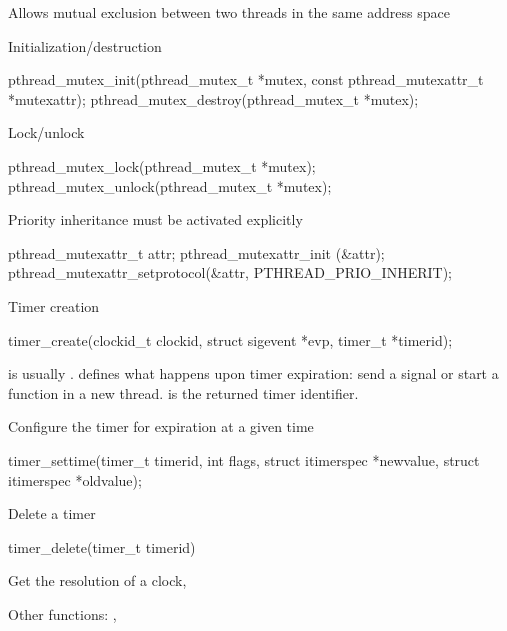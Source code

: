   \startitemize
  \item Allows mutual exclusion between two threads in the same
    address space
  \item Initialization/destruction
    \begin{block}{}
\starttyping
pthread_mutex_init(pthread_mutex_t *mutex,
                   const pthread_mutexattr_t *mutexattr);
pthread_mutex_destroy(pthread_mutex_t *mutex);
\stoptyping
    \end{block}
  \item Lock/unlock
    \begin{block}{}
\starttyping
pthread_mutex_lock(pthread_mutex_t *mutex);
pthread_mutex_unlock(pthread_mutex_t *mutex);
\stoptyping
    \end{block}
  \item Priority inheritance must be activated explicitly
    \begin{block}{}
\starttyping
pthread_mutexattr_t attr;
pthread_mutexattr_init (&attr);
pthread_mutexattr_setprotocol(&attr, PTHREAD_PRIO_INHERIT);
\stoptyping
    \end{block}
  \stopitemize

  \small
  \startitemize
  \item Timer creation
    \begin{block}{}
\starttyping
timer_create(clockid_t clockid, struct sigevent *evp,
             timer_t *timerid);
\stoptyping
\small
    \end{block}
    \startitemize
    \item {} is usually
      .  defines what happens
      upon timer expiration: send a signal or start a function in a
      new thread.  is the returned timer identifier.
    \stopitemize
  \item Configure the timer for expiration at a given time
    \begin{block}{}
\starttyping
timer_settime(timer_t timerid, int flags,
              struct itimerspec *newvalue,
              struct itimerspec *oldvalue);
\stoptyping
\small
    \end{block}
  \item Delete a timer
    \begin{block}{}
\starttyping
timer_delete(timer_t timerid)
\stoptyping
\small
    \end{block}
  \item Get the resolution of a clock, 
  \item Other functions: , 
  \stopitemize

